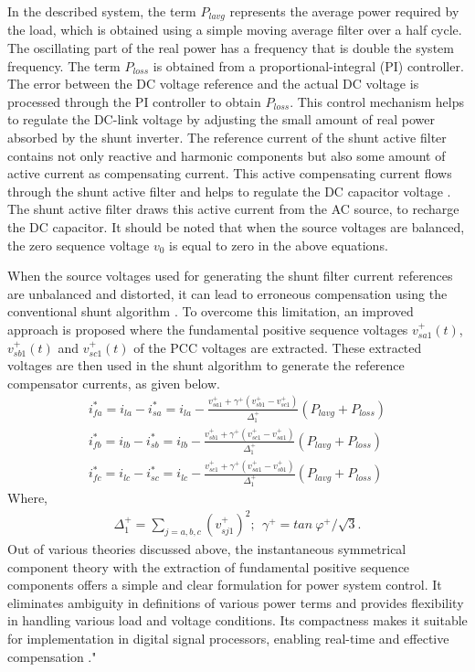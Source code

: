 In the described system, the term $P_{lavg}$ represents the average power required by the load, which is obtained using a simple moving average filter over a half cycle. The oscillating part of the real power has a frequency that is double the system frequency. The term $P_{loss}$ is obtained from a proportional-integral (PI) controller. The error between the DC voltage reference and the actual DC voltage is processed through the PI controller to obtain $P_{loss}$. This control mechanism helps to regulate the DC-link voltage by adjusting the small amount of real power absorbed by the shunt inverter. The reference current of the shunt active filter contains not only reactive and harmonic components but also some amount of active current as compensating current. This active compensating current flows through the shunt active filter and helps to regulate the DC capacitor voltage \cite{ghosh2000use}. The shunt active filter draws this active current from the AC source, to recharge the DC capacitor. It should be noted that when the source voltages are balanced, the zero sequence voltage $v_0$ is equal to zero in the above equations.

When the source voltages used for generating the shunt filter current references are unbalanced and distorted, it can lead to erroneous compensation using the conventional shunt algorithm \cite{4519806}. To overcome this limitation, an improved approach is proposed where the fundamental positive sequence voltages $v^{+}_{sa1}(t)$, $v^{+}_{sb1}(t)$ and $v^{+}_{sc1}(t)$ of the PCC voltages are extracted. These extracted voltages are then used in the shunt algorithm to generate the reference compensator currents, as given below.
\begin{equation}
\begin{split}
i^{*}_{fa} =  i_{la} - i^{*}_{sa} = i_{la}- \frac{v^{+}_{sa1}+\gamma^+(v^{+}_{sb1}-v^{+}_{sc1})}{\Delta^{+}_1}(P_{lavg}+P_{loss})\\
i^{*}_{fb} =  i_{lb} - i^{*}_{sb} = i_{lb}- \frac{v^{+}_{sb1}+\gamma^+(v^{+}_{sc1}-v^{+}_{sa1})}{\Delta^{+}_1}(P_{lavg}+P_{loss})\\
i^{*}_{fc} =  i_{lc} - i^{*}_{sc} = i_{lc}- \frac{v^{+}_{sc1}+\gamma^+(v^{+}_{sa1}-v^{+}_{sb1})}{\Delta^{+}_1}(P_{lavg}+P_{loss})
\end{split}
\label{eqn2.52}
\end{equation}
Where, 
\begin{equation}
\begin{split}
\Delta^+_1 = \sum_{j=a,b,c} (v^{+}_{sj1})^2; ~~ \gamma^+ = tan \: \varphi^+/\sqrt{3}.
\end{split}
\label{eqn2.53}
\end{equation}
Out of various theories discussed above, the instantaneous symmetrical component theory with the extraction of fundamental positive sequence components offers a simple and clear formulation for power system control. It eliminates ambiguity in definitions of various power terms and provides flexibility in handling various load and voltage conditions. Its compactness makes it suitable for implementation in digital signal processors, enabling real-time and effective compensation \cite{4519806,mahesh2010dsp}."

